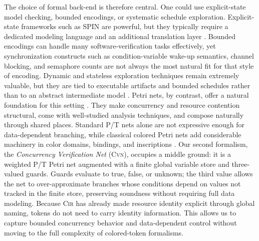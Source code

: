 The choice of formal back-end is therefore central. One could use explicit-state model checking, bounded encodings, or systematic schedule exploration. Explicit-state frameworks such as SPIN are powerful, but they typically require a dedicated modeling language and an additional translation layer \cite{Holzmann1997SPIN}. Bounded encodings can handle many software-verification tasks effectively, yet synchronization constructs such as condition-variable wake-up semantics, channel blocking, and semaphore counts are not always the most natural fit for that style of encoding. Dynamic and stateless exploration techniques remain extremely valuable, but they are tied to executable artifacts and bounded schedules rather than to an abstract intermediate model \cite{Godefroid1997VeriSoft,Flanagan2005DPOR,Musuvathi2008FairStateless}. Petri nets, by contrast, offer a natural foundation for this setting \cite{Murata1989PetriNets,Esparza2008Unfoldings}. They make concurrency and resource contention structural, come with well-studied analysis techniques, and compose naturally through shared places. Standard P/T nets alone are not expressive enough for data-dependent branching, while classical colored Petri nets add considerable machinery in color domains, bindings, and inscriptions \cite{Jensen2007CPNTools}. Our second formalism, the \emph{Concurrency Verification Net} (\textsc{Cvn}), occupies a middle ground: it is a weighted P/T Petri net augmented with a finite global variable store and three-valued guards. Guards evaluate to true, false, or unknown; the third value allows the net to over-approximate branches whose conditions depend on values not tracked in the finite store, preserving soundness without requiring full data modeling. Because \textsc{Cir} has already made resource identity explicit through global naming, tokens do not need to carry identity information. This allows us to capture bounded concurrency behavior and data-dependent control without moving to the full complexity of colored-token formalisms.

